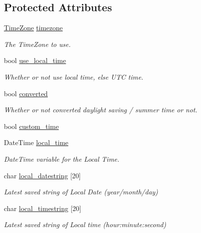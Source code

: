 \subsection*{Protected Attributes}
\begin{DoxyCompactItemize}
\item 
\hyperlink{class_loom_r_t_c_a103a9db94b031555185bbce688d2527a}{Time\+Zone} \hyperlink{class_loom_r_t_c_a6c1336bf000fd9a385f315d43bbbc5b0}{timezone}
\begin{DoxyCompactList}\small\item\em The Time\+Zone to use. \end{DoxyCompactList}\item 
bool \hyperlink{class_loom_r_t_c_a5783620e9af8eb5fa0818aa189483d8e}{use\+\_\+local\+\_\+time}
\begin{DoxyCompactList}\small\item\em Whether or not use local time, else U\+TC time. \end{DoxyCompactList}\item 
bool \hyperlink{class_loom_r_t_c_a79db2b47bfecccd825519e677bc43a43}{converted}
\begin{DoxyCompactList}\small\item\em Whether or not converted daylight saving / summer time or not. \end{DoxyCompactList}\item 
bool \hyperlink{class_loom_r_t_c_a91c96be6cc3f0f0f4dedbb038f164e73}{custom\+\_\+time}
\item 
Date\+Time \hyperlink{class_loom_r_t_c_ab3d490dd52a5e2d2413d1f0c00944a7b}{local\+\_\+time}
\begin{DoxyCompactList}\small\item\em Date\+Time variable for the Local Time. \end{DoxyCompactList}\item 
char \hyperlink{class_loom_r_t_c_a9692826e2c5093e528645a619fc16bc9}{local\+\_\+datestring} \mbox{[}20\mbox{]}
\begin{DoxyCompactList}\small\item\em Latest saved string of Local Date (year/month/day) \end{DoxyCompactList}\item 
char \hyperlink{class_loom_r_t_c_ae8fe182cd1fc3f7c66ef6b3ee353c51f}{local\+\_\+timestring} \mbox{[}20\mbox{]}
\begin{DoxyCompactList}\small\item\em Latest saved string of Local time (hour\+:minute\+:second) \end{DoxyCompactList}\item 

\end{DoxyCompactItemize}
